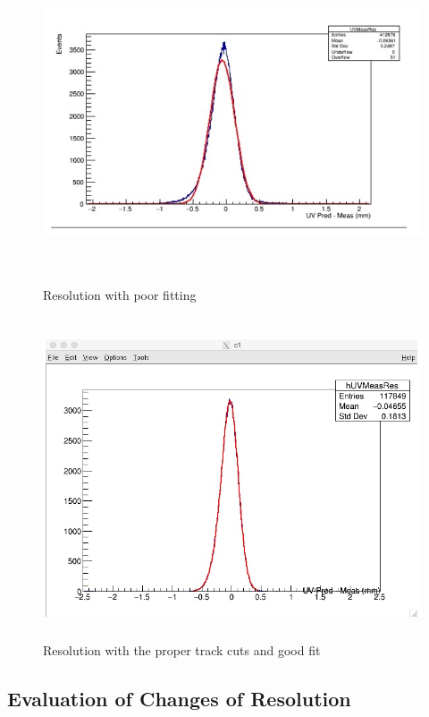 \documentclass[./Thesis]{subfiles}
\begin{document}
	
\begin{figure}
	\centerline{\includegraphics[height=95mm]{ResolutionNoGoodFit.jpeg}}
	\caption[Spacial Resolution with no track cuts]{ Resolution with poor fitting}
	\label{fig:NoGoodRes}
\end{figure}
	
\begin{figure}
	\centerline{\includegraphics[height=95mm]{GoodRes.jpeg}}
	\caption[Good Resolution]{ Resolution with the proper track cuts and good fit}
	\label{fig:goodRes}
\end{figure} 		
	
	
	 
\subsection{Evaluation of Changes of Resolution}
\end{document}
